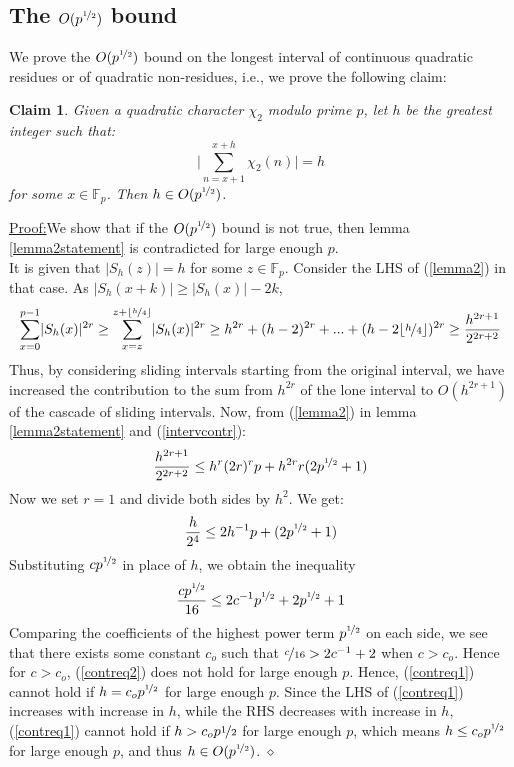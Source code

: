 \documentclass{report}
\newtheorem*{claim*}{Claim}
\newenvironment{claimproof}[1]{\vspace{2.5mm}\par\noindent\underline{Proof:}\space#1}{\hfill $\diamond$ \vspace{2.5mm} \par}
\begin{document}
\subsection*{The $O(p^{\nicefrac{1}{2}})$ bound}
We prove the $O(p^{\nicefrac{1}{2}})$ bound on the longest interval of continuous quadratic residues or of quadratic non-residues, i.e., we prove the following claim:
\begin{claim*}
Given a quadratic character $\chi_2$ modulo prime $p$, let $h$ be the greatest integer such that:
\[\bigg\lvert\sum\limits_{n=x+1}^{x+h}\chi_2(n)\bigg\rvert=h\]
 for some $x\in\mathbb{F}_p$. Then $h\in O(p^{\nicefrac{1}{2}})$.
\end{claim*}
\begin{claimproof}
We show that if the $O(p^{\nicefrac{1}{2}})$ bound is not true, then lemma \ref{lemma2statement} is contradicted for large enough $p$.\\
It is given that $\lvert S_h(z)\rvert=h$ for some $z\in \mathbb{F}_p$. Consider the LHS of (\ref{lemma2}) in that case. As $\lvert S_h(x+k)\rvert \geq \lvert S_h(x)\rvert-2k$,
\begin{equation} \label{intervcontr}
\sum\limits_{x=0}^{p-1}\lvert S_h(x)\rvert^{2r}\geq\sum\limits_{x=z}^{z+\lfloor\nicefrac{h}{4}\rfloor}\lvert S_h(x)\rvert^{2r} \geq h^{2r}+(h-2)^{2r}+...+(h-2\lfloor\nicefrac{h}{4}\rfloor)^{2r} \geq \frac{h^{2r+1}}{2^{2r+2}}
\end{equation}
Thus, by considering sliding intervals starting from the original interval, we have increased the contribution to the sum from $h^{2r}$ of the lone interval to $O(h^{2r+1})$ of the cascade of sliding intervals. Now, from (\ref{lemma2}) in lemma \ref{lemma2statement} and (\ref{intervcontr}):
$$ \frac{h^{2r+1}}{2^{2r+2}} \leq h^{r}(2r)^{r}p+h^{2r}r(2p^{\nicefrac{1}{2}}+1)$$
Now we set $r=1$ and divide both sides by $h^{2}$. We get:
\begin{equation} \label{contreq1}
\frac{h}{2^{4}} \leq 2h^{-1}p+(2p^{\nicefrac{1}{2}}+1)
\end{equation}
Substituting $cp^{\nicefrac{1}{2}}$ in place of $h$, we obtain the inequality
\begin{equation} \label{contreq2}
\frac{cp^{\nicefrac{1}{2}}}{16} \leq 2c^{-1}p^{\nicefrac{1}{2}}+2p^{\nicefrac{1}{2}}+1
\end{equation}
Comparing the coefficients of the highest power term $p^{\nicefrac{1}{2}}$ on each side, we see that there exists some constant $c_o$ such that $\nicefrac{c}{16}>2c^{-1}+2$ when $c>c_o$. Hence for $c>c_o$, (\ref{contreq2}) does not hold for large enough $p$. Hence, (\ref{contreq1}) cannot hold if $h=c_op^{\nicefrac{1}{2}}$ for large enough $p$. Since the LHS of (\ref{contreq1}) increases with increase in $h$, while the RHS decreases with increase in $h$, (\ref{contreq1}) cannot hold if $h>c_op{\nicefrac{1}{2}}$ for large enough $p$, which means $h\leq c_op^{\nicefrac{1}{2}}$ for large enough $p$, and thus $h\in O(p^{\nicefrac{1}{2}})$.
\end{claimproof}
%
%
\end{document}
